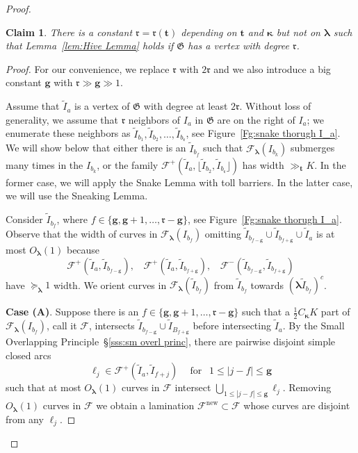 \documentclass{amsart}
\renewcommand{\sp}{{\ \ }}
\newcommand{\1}{{\mathbb 1 }}
\newcommand{\blambda}{{\boldsymbol\lambda}}
\newcommand{\bkappa}{{\boldsymbol\kappa}}
\newcommand{\Fam}{{\mathcal F}}
\newcommand{\bbt}{{\mathbf t}}
\newcommand{\bbg}{{\mathbf g}}
\newcommand{\rr}{\mathfrak{r}}
\newcommand\new{{\operatorname{new}}}
\newtheorem{claim}{Claim}
\theoremstyle{remark}
\numberwithin{equation}{section}
\theoremstyle{definition}
\begin{document}
\begin{proof}
\begin{claim}
\label{cl:5}
There is a constant $\rr=\rr(\bbt)$ depending on $\bbt$ and $\bkappa$ but not on $\blambda$ such that Lemma~\ref{lem:Hive Lemma}  holds if $\mathfrak G$ has a vertex with degree $\rr$.
\end{claim}
\begin{proof}
For our convenience, we replace $\rr$ with $2\rr$ and we also introduce a big constant $\bbg$ with $\rr\gg \bbg \gg 1$.


  Assume that $\widetilde I_a$ is a vertex of $\mathfrak G$ with degree at least $2\rr$. Without loss of generality, we assume that $\rr$ neighbors of $I_a$ in $\mathfrak G$ are on the right of $I_a$; we enumerate these neighbors as $\widetilde  I_{b_1},\widetilde  I_{b_2},\dots , \widetilde  I_{b_\rr}$, see Figure~\ref{Fg:snake thorugh I_a}. We will show below that either there is an $\widetilde I_{b_f}$ such that $\Fam_\blambda (I_{b_k})$ submerges many times in the $I_{b_k}$, or the family $\Fam^+\left(\widetilde I_a, \lfloor \widetilde I_{b_2}, \widetilde I_{b_\rr}\rfloor\right)$ has width $\gg_{\bbt} K$. In the former case, we will apply the Snake Lemma with toll barriers. In the latter case, we will use the Sneaking Lemma. 
    
  
    Consider $\widetilde  I_{b_f}$, where $f\in \{\bbg, \bbg+1,\dots, \rr-\bbg\}$, see Figure~\ref{Fg:snake thorugh I_a}. Observe that the width of curves in $\Fam_\blambda(I_{b_f})$ omitting $\widetilde I_{b_{f-\bbg}} \cup \widetilde I_{b_{f+\bbg}}\cup \widetilde I_a$ is at most $O_{\blambda}(1)$ because \[\Fam^+(\widetilde I_a, \widetilde I_{b_{f-\bbg}}),\sp\sp \Fam^+(\widetilde I_a, \widetilde I_{b_{f+\bbg}}),\sp\sp \Fam^-(\widetilde I_{b_{f-\bbg}}, \widetilde I_{b_{f+\bbg}}) \] have $\succeq_\blambda 1$ width. We orient curves in $\Fam_\blambda(\widetilde I_{b_f})$ from $\widetilde I_{b_f}$ towards $(\blambda \widetilde I_{b_f})^c$.
  
{\bf Case (A)}. Suppose there is an $f\in \{\bbg, \bbg+1,\dots, \rr-\bbg\}$ such that a $\frac 1 2 C_{\bkappa} K$ part of $\Fam_\blambda(I_{b_f})$, call it $\Fam$, intersects $\widetilde I_{b_{f-\bbg}} \cup \widetilde I_{B_{f+\bbg}}$ before intersecting $\widetilde I_a$. By the Small Overlapping Principle~\S\ref{sss:sm overl princ}, there are pairwise disjoint simple closed arcs \[\ell_j\in \Fam^+(\widetilde I_a, \widetilde I_{f+j})\sp\sp\text{ for }\sp  1\le |j-f|\le \bbg\] 
such that at most $O_\blambda(1)$ curves in $\Fam$ intersect $\bigcup_{1\le |j-f|\le \bbg} \ell_j$. Removing $O_\blambda(1)$ curves in $\Fam$ we obtain a lamination $\Fam^\new\subset \Fam$ whose curves are disjoint from any $\ell_j$. 


\end{proof}
\end{proof}
\end{document}
